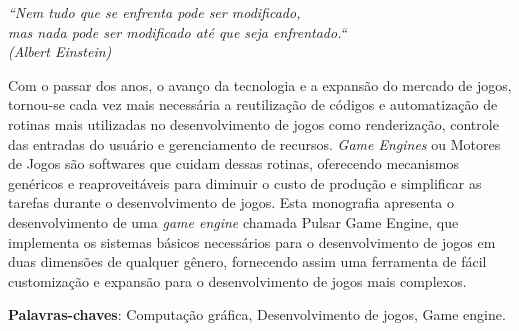 \documentclass[12pt,	openright, twoside,	a4paper, english, french, spanish, brazil]{abntex2}
\begin{document}


\begin{epigrafe}
    \vspace*{\fill}
	\begin{flushright}
		\textit{``Nem tudo que se enfrenta pode ser modificado, \\ 
		mas nada pode ser modificado até que seja enfrentado.``\\ 
		(Albert Einstein)}
	\end{flushright}
\end{epigrafe}


\setlength{\absparsep}{18pt} %
\begin{resumo}
Com o passar dos anos, o avanço da tecnologia e a expansão do mercado de jogos, tornou-se cada vez mais necessária a reutilização de códigos e automatização de rotinas mais utilizadas no desenvolvimento de jogos como renderização, controle das entradas do usuário e gerenciamento de recursos.
\textit{Game Engines} ou Motores de Jogos são softwares que cuidam dessas rotinas, oferecendo mecanismos genéricos e reaproveitáveis para diminuir o custo de produção e simplificar as tarefas durante o desenvolvimento de jogos. 
Esta monografia apresenta o desenvolvimento de uma \textit{game engine} chamada Pulsar Game Engine, que implementa os sistemas básicos necessários para o desenvolvimento de jogos em duas dimensões de qualquer gênero, fornecendo assim uma ferramenta de fácil customização e expansão para o desenvolvimento de jogos mais complexos. 

 \textbf{Palavras-chaves}: Computação gráfica, Desenvolvimento de jogos, Game engine.
\end{resumo}
\end{document}
